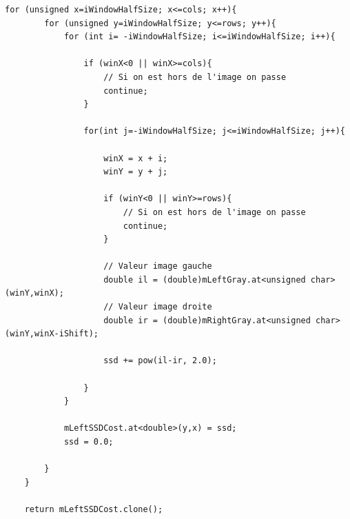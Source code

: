 \documentclass[a4paper,11pt]{article}
\begin{document}
\begin{lstlisting}[caption=Calcul de la SSD gauche]
    for (unsigned x=iWindowHalfSize; x<=cols; x++){
        for (unsigned y=iWindowHalfSize; y<=rows; y++){
            for (int i= -iWindowHalfSize; i<=iWindowHalfSize; i++){

                if (winX<0 || winX>=cols){
                    // Si on est hors de l'image on passe
                    continue;
                }

                for(int j=-iWindowHalfSize; j<=iWindowHalfSize; j++){

                    winX = x + i;
                    winY = y + j;

                    if (winY<0 || winY>=rows){
                        // Si on est hors de l'image on passe
                        continue;
                    }

                    // Valeur image gauche
                    double il = (double)mLeftGray.at<unsigned char>(winY,winX);
                    // Valeur image droite
                    double ir = (double)mRightGray.at<unsigned char>(winY,winX-iShift);

                    ssd += pow(il-ir, 2.0);

                }
            }

            mLeftSSDCost.at<double>(y,x) = ssd;
            ssd = 0.0;

        }
    }

    return mLeftSSDCost.clone();
\end{lstlisting}

\newpage
\end{document}

